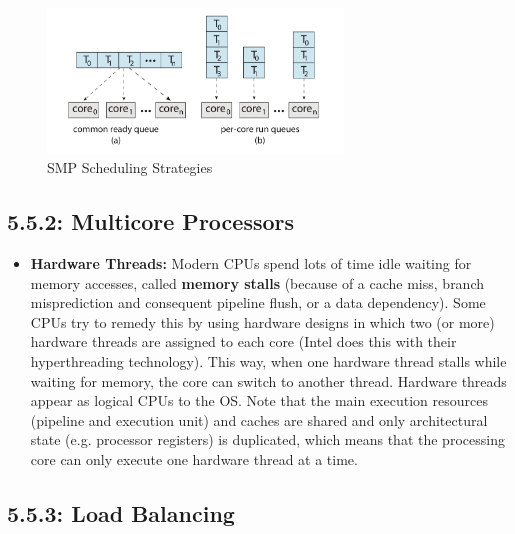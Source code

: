 \documentclass[12pt]{article}
\begin{document}
\begin{itemize}
\begin{figure}[ht]
            \centering
            \includegraphics[width=0.7\textwidth]{figures/smp-scheduling.jpg}
            \caption{SMP Scheduling Strategies}
            \label{fig:smp-scheduling}
        \end{figure}
\end{itemize}

\subsection*{5.5.2: Multicore Processors}

\begin{itemize}
    \item \textbf{Hardware Threads:} Modern CPUs spend lots of time idle waiting for memory accesses, called \textbf{memory stalls} (because of a cache miss, branch misprediction and consequent pipeline flush, or a data dependency). Some CPUs try to remedy this by using hardware designs in which two (or more) hardware threads are assigned to each core (Intel does this with their hyperthreading technology). This way, when one hardware thread stalls while waiting for memory, the core can switch to another thread. Hardware threads appear as logical CPUs to the OS. Note that the main execution resources (pipeline and execution unit) and caches are shared and only architectural state (e.g. processor registers) is duplicated, which means that the processing core can only execute one hardware thread at a time.
\end{itemize}

\subsection*{5.5.3: Load Balancing}
\end{document}
